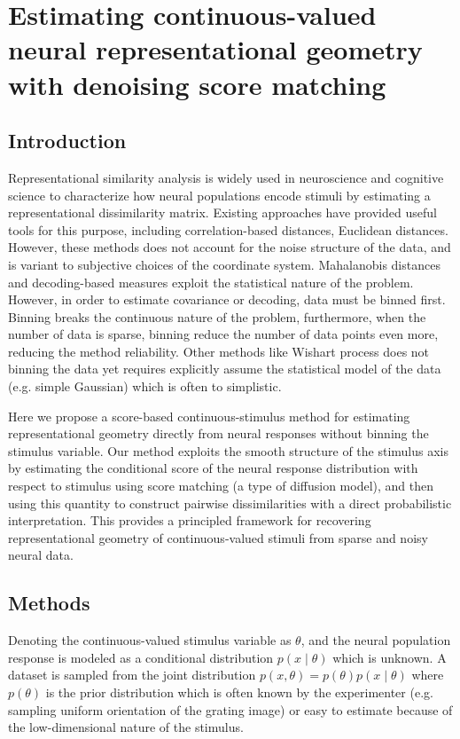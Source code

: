 \section{Estimating continuous-valued neural representational geometry with denoising score matching}

\subsection{Introduction}
Representational similarity analysis is widely used in neuroscience and cognitive science to characterize how neural populations encode stimuli by estimating a representational dissimilarity matrix. Existing approaches have provided useful tools for this purpose, including correlation-based distances, Euclidean distances. However, these methods does not account for the noise structure of the data, and is variant to subjective choices of the coordinate system. Mahalanobis distances and decoding-based measures exploit the statistical nature of the problem. However, in order to estimate covariance or decoding, data must be binned first. Binning breaks the continuous nature of the problem, furthermore, when the number of data is sparse, binning reduce the number of data points even more, reducing the method reliability. Other methods like Wishart process does not binning the data yet requires explicitly assume the statistical model of the data (e.g. simple Gaussian) which is often to simplistic.

Here we propose a score-based continuous-stimulus method for estimating representational geometry directly from neural responses without binning the stimulus variable. Our method exploits the smooth structure of the stimulus axis by estimating the conditional score of the neural response distribution with respect to stimulus using score matching (a type of diffusion model), and then using this quantity to construct pairwise dissimilarities with a direct probabilistic interpretation. This provides a principled framework for recovering representational geometry of continuous-valued stimuli from sparse and noisy neural data.

\subsection{Methods}
Denoting the continuous-valued stimulus variable as $\theta$, and the neural population response is modeled as a conditional distribution $p(x\mid \theta)$ which is unknown. A dataset is sampled from the joint distribution $p(x, \theta) = p(\theta)p(x\mid \theta)$ where $p(\theta)$ is the prior distribution which is often known by the experimenter (e.g. sampling uniform orientation of the grating image) or easy to estimate because of the low-dimensional nature of the stimulus.


